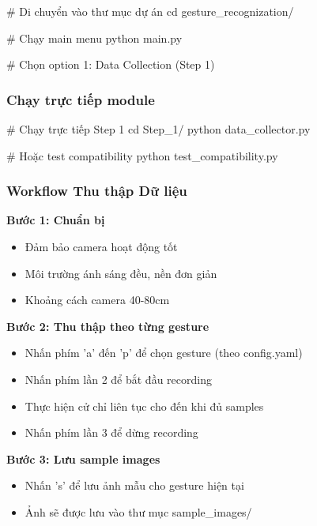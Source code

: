 \begin{aivncodebox}
\begin{python}
# Di chuyển vào thư mục dự án
cd gesture_recognization/

# Chạy main menu
python main.py

# Chọn option 1: Data Collection (Step 1)
\end{python}
\end{aivncodebox}

\subsubsection{Chạy trực tiếp module}

\begin{aivncodebox}
\begin{python}
# Chạy trực tiếp Step 1
cd Step_1/
python data_collector.py

# Hoặc test compatibility
python test_compatibility.py
\end{python}
\end{aivncodebox}

\subsubsection{Workflow Thu thập Dữ liệu}

\textbf{Bước 1: Chuẩn bị}
\begin{itemize}
    \item Đảm bảo camera hoạt động tốt
    \item Môi trường ánh sáng đều, nền đơn giản
    \item Khoảng cách camera 40-80cm
\end{itemize}

\textbf{Bước 2: Thu thập theo từng gesture}
\begin{itemize}
    \item Nhấn phím 'a' đến 'p' để chọn gesture (theo config.yaml)
    \item Nhấn phím lần 2 để bắt đầu recording
    \item Thực hiện cử chỉ liên tục cho đến khi đủ samples
    \item Nhấn phím lần 3 để dừng recording
\end{itemize}

\textbf{Bước 3: Lưu sample images}
\begin{itemize}
    \item Nhấn 's' để lưu ảnh mẫu cho gesture hiện tại
    \item Ảnh sẽ được lưu vào thư mục sample\_images/
\end{itemize}

